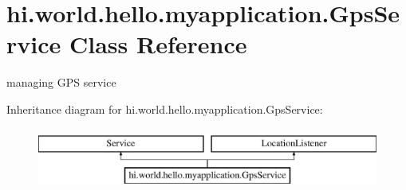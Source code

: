\hypertarget{classhi_1_1world_1_1hello_1_1myapplication_1_1_gps_service}{}\section{hi.\+world.\+hello.\+myapplication.\+Gps\+Service Class Reference}
\label{classhi_1_1world_1_1hello_1_1myapplication_1_1_gps_service}


managing G\+PS service  


Inheritance diagram for hi.\+world.\+hello.\+myapplication.\+Gps\+Service\+:\begin{figure}[H]
\begin{center}
\leavevmode
\includegraphics[height=2.000000cm]{classhi_1_1world_1_1hello_1_1myapplication_1_1_gps_service}
\end{center}
\end{figure}
